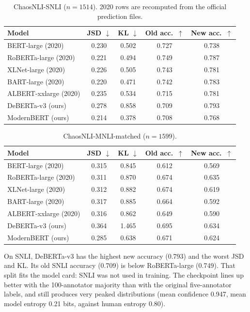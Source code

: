 \documentclass[11pt,a4paper]{article}
\begin{document}
\begin{table}[H]
\centering
\small
\caption{ChaosNLI-SNLI ($n=1514$). 2020 rows are recomputed from the official prediction files.}
\label{tab:snli}
\begin{tabular}{lcccc}
\toprule
Model & JSD $\downarrow$ & KL $\downarrow$ & Old acc.\ $\uparrow$ & New acc.\ $\uparrow$ \\
\midrule
BERT-large (2020) & 0.230 & 0.502 & 0.727 & 0.738 \\
RoBERTa-large (2020) & 0.221 & 0.494 & 0.749 & 0.787 \\
XLNet-large (2020) & 0.226 & 0.505 & 0.743 & 0.781 \\
BART-large (2020) & 0.220 & 0.471 & 0.742 & 0.783 \\
ALBERT-xxlarge (2020) & 0.235 & 0.534 & 0.715 & 0.781 \\
DeBERTa-v3 (ours) & 0.278 & 0.858 & 0.709 & 0.793 \\
ModernBERT (ours) & 0.214 & 0.378 & 0.708 & 0.768 \\
\bottomrule
\end{tabular}
\end{table}

\begin{table}[H]
\centering
\small
\caption{ChaosNLI-MNLI-matched ($n=1599$).}
\label{tab:mnli}
\begin{tabular}{lcccc}
\toprule
Model & JSD $\downarrow$ & KL $\downarrow$ & Old acc.\ $\uparrow$ & New acc.\ $\uparrow$ \\
\midrule
BERT-large (2020) & 0.315 & 0.845 & 0.612 & 0.569 \\
RoBERTa-large (2020) & 0.311 & 0.870 & 0.674 & 0.635 \\
XLNet-large (2020) & 0.312 & 0.882 & 0.674 & 0.619 \\
BART-large (2020) & 0.317 & 0.885 & 0.664 & 0.592 \\
ALBERT-xxlarge (2020) & 0.316 & 0.862 & 0.649 & 0.590 \\
DeBERTa-v3 (ours) & 0.364 & 1.465 & 0.695 & 0.634 \\
ModernBERT (ours) & 0.285 & 0.638 & 0.671 & 0.624 \\
\bottomrule
\end{tabular}
\end{table}

On SNLI, DeBERTa-v3 has the highest new accuracy (0.793) and the worst JSD and KL. Its old SNLI accuracy (0.709) is below RoBERTa-large (0.749). That split fits the model card: SNLI was not used in training. The checkpoint lines up better with the 100-annotator majority than with the original five-annotator labels, and still produces very peaked distributions (mean confidence 0.947, mean model entropy 0.21 bits, against human entropy 0.80).
\end{document}
